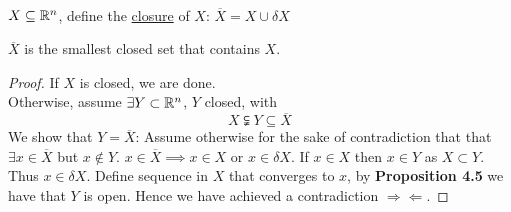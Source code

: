 \\

\begin{defn}
  $X \subseteq \mathbb{R}^n$, define the \ul{closure} of $X$: $\overline{X}=X\cup \delta X$
\end{defn}
\begin{theorem}
  $\overline{X}$ is the smallest closed set that contains $X$.
\end{theorem}
\begin{proof}
  If $X$ is closed, we are done. \\
  Otherwise, assume $\exists Y\subset \mathbb{R}^n$, $Y$ closed, with
  \[X\subsetneqq Y \subseteq \overline{X}\]
  We show that $Y=\overline{X}$: Assume otherwise for the sake of contradiction that that $\exists x\in \overline{X}$ but $x\not\in Y$. $x\in \overline{X}\implies x\in X$ or $x\in \delta X$. If $x\in X$ then $x\in Y$ as $X\subset Y$. Thus $x\in \delta X$. Define sequence in $X$ that converges to $x$, by \textbf{Proposition 4.5} we have that $Y$ is open. Hence we have achieved a contradiction $\Rightarrow \!\Leftarrow$. 
\end{proof}
